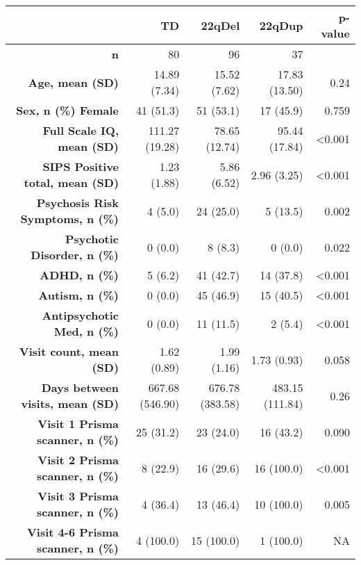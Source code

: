 \begin{longtable}{rrrrr}
\toprule
  & TD & 22qDel & 22qDup & p-value \\ 
\midrule\addlinespace[2.5pt]
\textbf{n} & 80 & 96 & 37 &  \\ 
\textbf{Age, mean (SD)} & 14.89 (7.34) & 15.52 (7.62) & 17.83 (13.50) & 0.24 \\ 
\textbf{Sex, n (\%) Female} & 41 (51.3)  & 51 (53.1)  & 17 (45.9)  & 0.759 \\ 
\textbf{Full Scale IQ, mean (SD)} & 111.27 (19.28) & 78.65 (12.74) & 95.44 (17.84) & <0.001 \\ 
\textbf{SIPS Positive total, mean (SD)} & 1.23 (1.88) & 5.86 (6.52) & 2.96 (3.25) & <0.001 \\ 
\textbf{Psychosis Risk Symptoms, n (\%)} & 4 (5.0)  & 24 (25.0)  & 5 (13.5)  & 0.002 \\ 
\textbf{Psychotic Disorder, n (\%)} & 0 (0.0)  & 8 (8.3)  & 0 (0.0)  & 0.022 \\ 
\textbf{ADHD, n (\%)} & 5 (6.2)  & 41 (42.7)  & 14 (37.8)  & <0.001 \\ 
\textbf{Autism, n (\%)} & 0 (0.0)  & 45 (46.9)  & 15 (40.5)  & <0.001 \\ 
\textbf{Antipsychotic Med, n (\%)} & 0 (0.0)  & 11 (11.5)  & 2 (5.4)  & <0.001 \\ 
\textbf{Visit count, mean (SD)} & 1.62 (0.89) & 1.99 (1.16) & 1.73 (0.93) & 0.058 \\ 
\textbf{Days between visits, mean (SD)} & 667.68 (546.90) & 676.78 (383.58) & 483.15 (111.84) & 0.26 \\ 
\textbf{Visit 1 Prisma scanner, n (\%)} & 25 (31.2)  & 23 (24.0)  & 16 (43.2)  &  0.090 \\ 
\textbf{Visit 2 Prisma scanner, n (\%)} &  8 (22.9)  & 16 (29.6)  & 16 (100.0)  & <0.001 \\ 
\textbf{Visit 3 Prisma scanner, n (\%)} &  4 (36.4)  & 13 (46.4)  & 10 (100.0)  &  0.005 \\ 
\textbf{Visit 4-6 Prisma scanner, n (\%)} & 4 (100.0)  & 15 (100.0)  & 1 (100.0)  &  NA \\ 
\bottomrule
\end{longtable}


